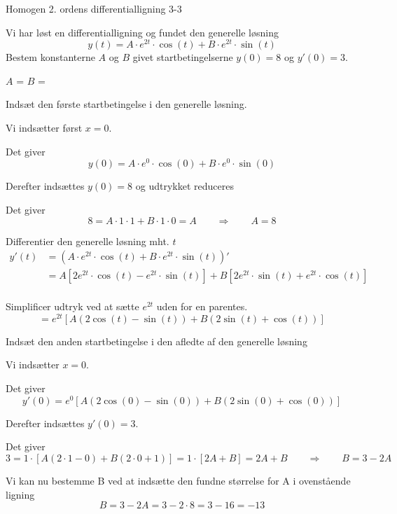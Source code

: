 \documentclass{article}
\begin{document}
\newpage

\begin{exercise}{Homogen 2. ordens differentialligning 3-3}
	
	Vi har løst en differentialligning og fundet den generelle løsning
	\[
	y(t) = A \cdot e^{2 t}  \cdot \cos(t)+ B \cdot e^{2 t}  \cdot \sin(t)
	\]
	Bestem konstanterne $A$ og $B$ givet startbetingelserne $y(0)=8$ og $y'(0)=3$.
	
	
	$A$ = 		
$B$ = 
	
	\hint
	
	Indsæt den første startbetingelse i den generelle løsning. 
	
	
	\hint
	
	Vi indsætter først $x=0$.
	
	\hint
	
	Det giver
	\[
	y(0)=  A \cdot e^{0}  \cdot \cos(0)+ B \cdot e^{0}  \cdot \sin(0)
	\]
	
	\hint
	
	Derefter indsættes $y(0)=8$ og udtrykket reduceres
	
	\hint 
	
	Det giver 
	\[
	8= A \cdot 1  \cdot 1+ B \cdot 1  \cdot 0  = A \qquad \Rightarrow \qquad A = 8
	\]
	
	\hint 
	
	Differentier den generelle løsning mht. $t$
	\begin{align*}
	y'(t) &= \left(A \cdot e^{2 t}  \cdot \cos(t)+ B \cdot e^{2 t}  \cdot \sin(t)\right)' \\
	&= A \left[2 e^{2t} \cdot \cos(t) - e^{2t} \cdot \sin(t) \right] + B \left[ 2 e^{2t} \cdot \sin(t) + e^{2t} \cdot \cos(t) \right] \\
	\end{align*}
	
	\hint
	
	Simplificer udtryk ved at sætte $e^{2t}$ uden for en parentes.
	\[
	= e^{2t} \left[ A (2 \cos(t)-\sin(t)) + B (2 \sin(t) + \cos(t))   \right]
	\]
	
	\hint 
	
	Indsæt den anden startbetingelse i den afledte af den generelle løsning
	
	\hint
	
	Vi indsætter $x=0$.
	
	\hint 
	
	Det giver
	\[
	y'(0) = e^{0} \left[ A (2 \cos(0)- \sin(0)) + B (2 \sin(0) + \cos(0))   \right]
	\]
	
	\hint 
	
	Derefter indsættes $y'(0)=3$.	
	\hint
	
	Det giver
	\[
	3 = 1 \cdot \left[ A (2 \cdot 1 - 0) + B (2 \cdot 0 + 1)   \right] = 1 \cdot \left[ 2A + B    \right] = 2 A + B \qquad \Rightarrow \qquad B = 3 - 2 A
	\]
	
	\hint 
	
	Vi kan nu bestemme B ved at indsætte den fundne størrelse for A i ovenstående ligning
	\[
	B = 3 - 2 A = 3 - 2 \cdot 8  = 3 - 16  =  -13
	\]
	
	
\end{exercise}
\end{document}
